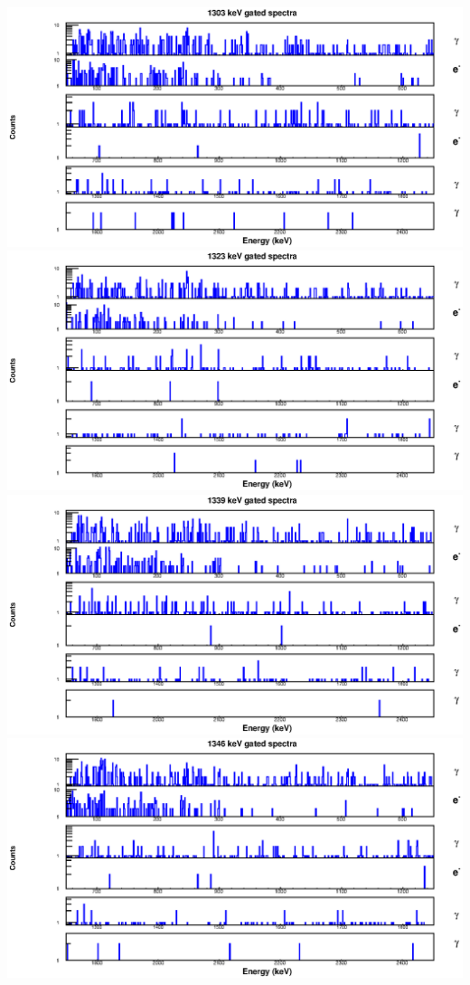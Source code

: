 \begin{landscape}
\includegraphics[scale=1.2]{154Gd_Appendix/1303_combined.eps}
\includegraphics[scale=1.2]{154Gd_Appendix/1323_combined.eps}
\includegraphics[scale=1.2]{154Gd_Appendix/1339_combined.eps}
\includegraphics[scale=1.2]{154Gd_Appendix/1346_combined.eps}

\end{landscape}
